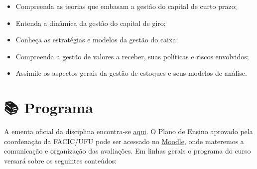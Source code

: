 \documentclass[
  a4paper,
]{book}
\begin{document}
\begin{itemize}
\item
  Compreenda as teorias que embasam a gestão do capital de curto prazo;
\item
  Entenda a dinâmica da gestão do capital de giro;
\item
  Conheça as estratégias e modelos da gestão do caixa;
\item
  Compreenda a gestão de valores a receber, suas políticas e riscos
  envolvidos;
\item
  Assimile os aspectos gerais da gestão de estoques e seus modelos de
  análise.
\end{itemize}

\section*{📚 Programa}\label{sec-programa}


A ementa oficial da disciplina encontra-se
\href{https://www.facic.ufu.br/system/files/conteudo/28fagen39532_financas_corporativas_i.pdf}{aqui}.
O Plano de Ensino aprovado pela coordenação da FACIC/UFU pode ser
acessado no \href{https://moodle.ufu.br/login/index.php}{Moodle}, onde
materemos a comunicação e organização das avaliações. Em linhas gerais o
programa do curso versará sobre os seguintes conteúdos:
\end{document}
